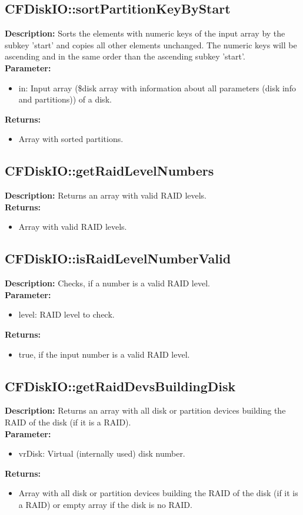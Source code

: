 \subsection{CFDiskIO::sortPartitionKeyByStart}
\textbf{Description:} Sorts the elements with numeric keys of the input array by the subkey 'start' and copies all other elements unchanged. The numeric keys will be ascending and in the same order than the ascending subkey 'start'.\\
\textbf{Parameter:}
\begin{itemize}
\item in: Input array (\$disk array with information about all parameters (disk info and partitions)) of a disk.
\end{itemize}
\textbf{Returns:}
\begin{itemize}
\item Array with sorted partitions.
\end{itemize}

\subsection{CFDiskIO::getRaidLevelNumbers}
\textbf{Description:} Returns an array with valid RAID levels.\\
\textbf{Returns:}
\begin{itemize}
\item Array with valid RAID levels.
\end{itemize}

\subsection{CFDiskIO::isRaidLevelNumberValid}
\textbf{Description:} Checks, if a number is a valid RAID level.\\
\textbf{Parameter:}
\begin{itemize}
\item level: RAID level to check.
\end{itemize}
\textbf{Returns:}
\begin{itemize}
\item true, if the input number is a valid RAID level.
\end{itemize}

\subsection{CFDiskIO::getRaidDevsBuildingDisk}
\textbf{Description:} Returns an array with all disk or partition devices building the RAID of the disk (if it is a RAID).\\
\textbf{Parameter:}
\begin{itemize}
\item vrDisk: Virtual (internally used) disk number.
\end{itemize}
\textbf{Returns:}
\begin{itemize}
\item Array with all disk or partition devices building the RAID of the disk (if it is a RAID) or empty array if the disk is no RAID.
\end{itemize}

